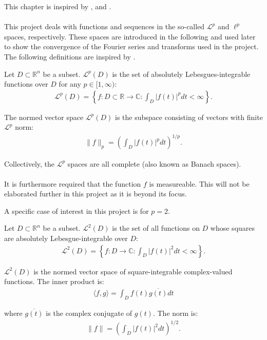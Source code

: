 This chapter is inspired by \cite{FAA}, \cite{FSP} and \cite{FTFA}.
\\ \\
This project deals with functions and sequences in the so-called $\mathcal{L}^p$ and $\ell^p$ spaces, respectively. These spaces are introduced in the following and used later to show the convergence of the Fourier series and transforms used in the project. The following definitions are inspired by \cite{page 31, FSP}.

\begin{definition}
Let $D \subset \mathbb{R}^n$ be a subset. $\mathcal{L}^p(D)$ is the set of absolutely Lebesgues-integrable functions over $D$ for any $p \in [1,\infty)$:
\begin{align*}
\mathcal{L}^p(D) = \left\{ f: D \subset \mathbb{R} \to \mathbb{C}: \int_D |f(t)|^p dt < \infty \right\}.
\end{align*}

The normed vector space $\mathcal{L}^p(D)$ is the subspace consisting of vectors with finite $\mathcal{L}^p$ norm:
\begin{align*}
\|f\|_p = \left( \int_D |f(t)|^p dt \right)^{1/p}.
\end{align*}

Collectively, the $\mathcal{L}^p$ spaces are all complete (also known as Banach spaces).
\\ \\
It is furthermore required that the function $f$ is measureable. This will not be elaborated further in this project as it is beyond its focus.
\end{definition}

A specific case of interest in this project is for $p = 2$.

\begin{definition}
Let $D \subset \mathbb{R}^n$ be a subset. $\mathcal{L}^2(D)$ is the set of all functions on $D$ whose squares are absolutely Lebesgue-integrable over $D$:
\begin{align*}
\mathcal{L}^2(D) = \left\{ f: D \to \mathbb{C}: \int_D |f(t)|^2 dt < \infty \right\}.
\end{align*}

$\mathcal{L}^2(D)$ is the normed vector space of square-integrable complex-valued functions. The inner product is:
\begin{align*}
\langle f,g \rangle =  \int_D f(t) \overline{g(t)} dt
\end{align*}

where $\overline{g(t)}$ is the complex conjugate of $g(t)$. The norm is:
\begin{align*}
\|f\| = \left( \int_D |f(t)|^2 dt \right)^{1/2}.
\end{align*}

\end{definition}

